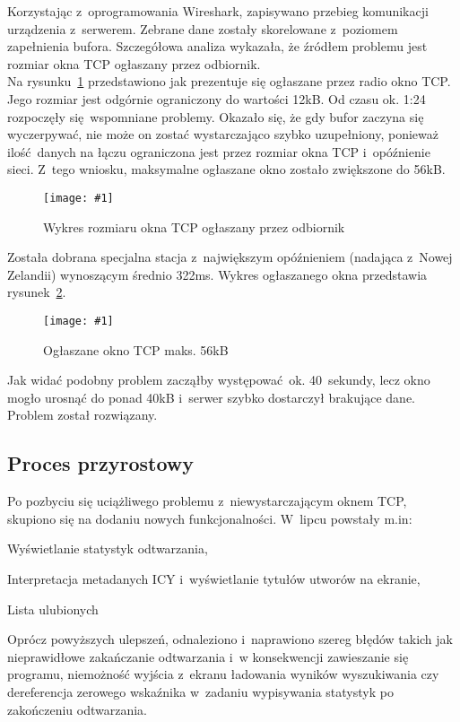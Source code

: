 \documentclass[polish]{aghengthesis}
\let\tempone\itemize
\let\temptwo\enditemize
\renewenvironment{itemize}{\tempone\setlength{\itemsep}{0cm}}{\temptwo}
\newcommand{\imgint}[4]{
	\begin{figure}[{#4}]
		\centering
		\texttt{[image: \#1]}
		\caption{#2}
		\label{#1}
	\end{figure}
}
\newcommand{\imgh}[3]{\imgint{#1}{#2}{#3}{H}}
\begin{document}
			Korzystając z~oprogramowania Wireshark\textsuperscript{\cite{wireshark}}, zapisywano przebieg komunikacji urządzenia z~serwerem.
			Zebrane dane zostały skorelowane z~poziomem zapełnienia bufora. Szczegółowa analiza wykazała, że źródłem problemu jest rozmiar okna TCP ogłaszany przez odbiornik.
			$ $\\
			
			Na rysunku~\ref{4/tcp_fail} przedstawiono jak prezentuje się ogłaszane przez radio okno TCP.
			Jego rozmiar jest odgórnie ograniczony do wartości 12kB.
			Od czasu ok. 1:24 rozpoczęły się wspomniane problemy. Okazało się, że gdy bufor zaczyna się wyczerpywać, nie może on zostać wystarczająco szybko uzupełniony, ponieważ ilość danych na łączu ograniczona jest przez rozmiar okna TCP i~opóźnienie sieci. Z~tego wniosku, maksymalne ogłaszane okno zostało zwiększone do 56kB.
			\imgh{4/tcp_fail}{Wykres rozmiaru okna TCP ogłaszany przez odbiornik}{0.85}
			
			Została dobrana specjalna stacja z~największym opóźnieniem (nadająca z~Nowej Zelandii) wynoszącym średnio 322ms. Wykres ogłaszanego okna przedstawia rysunek~\ref{4/tcp_good}.
			
			\imgh{4/tcp_good}{Ogłaszane okno TCP maks. 56kB}{0.6}

			Jak widać podobny problem zacząłby występować ok. 40~sekundy, lecz okno mogło urosnąć do ponad 40kB i~serwer szybko dostarczył brakujące dane. Problem został rozwiązany.
			
		\subsection{Proces przyrostowy}
			Po pozbyciu się uciążliwego problemu z~niewystarczającym oknem TCP, skupiono się na dodaniu nowych funkcjonalności. W~lipcu powstały m.in:
			\begin{itemize}
				\item Wyświetlanie statystyk odtwarzania,
				\item Interpretacja metadanych ICY i~wyświetlanie tytułów utworów na ekranie,
				\item Lista ulubionych
			\end{itemize}
			
			Oprócz powyższych ulepszeń, odnaleziono i~naprawiono szereg błędów takich jak nieprawidłowe zakańczanie odtwarzania i~w konsekwencji zawieszanie się programu, niemożność wyjścia z~ekranu ładowania wyników wyszukiwania czy dereferencja zerowego wskaźnika w~zadaniu wypisywania statystyk po zakończeniu odtwarzania.
			
\end{document}
